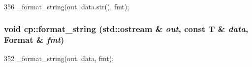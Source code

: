 \begin{DoxyCode}
356 { _format_string(out, data.str(), fmt); }
\end{DoxyCode}
\hypertarget{namespacecp_a302829141f210fff0ccc4f6c5a5d78fd}{
\subsubsection[{format\_\-string}]{\setlength{\rightskip}{0pt plus 5cm}void cp::format\_\-string (std::ostream \& {\em out}, \/  const T \& {\em data}, \/  Format \& {\em fmt})}}
\label{namespacecp_a302829141f210fff0ccc4f6c5a5d78fd}



\begin{DoxyCode}
352 { _format_string(out, data, fmt); }
\end{DoxyCode}
